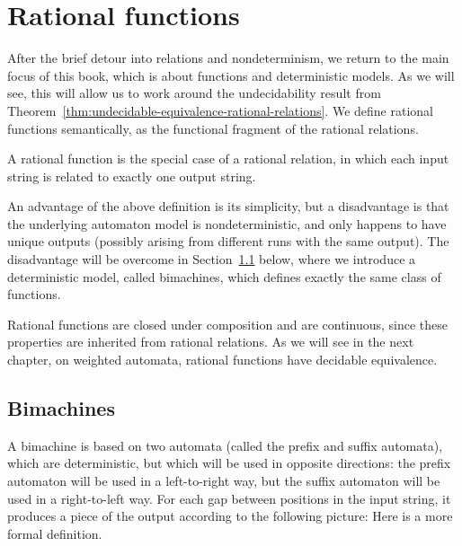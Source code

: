 \section{Rational functions}
\label{sec:rational-functions}

After the brief detour into relations and nondeterminism, we return to the main focus of this book, which is about  functions and deterministic models. As we will see, this will allow us to work around the undecidability result from Theorem~\ref{thm:undecidable-equivalence-rational-relations}. We define rational functions semantically, as the functional fragment of the rational relations. 

\begin{definition}
    \label{def:rational-function} A rational function is the special case of a rational relation, in which each input string is related to exactly one output string.
\end{definition}

An advantage of the above definition is its simplicity, but a disadvantage is that the underlying automaton model is nondeterministic, and only happens to have unique outputs (possibly arising from different runs with the same output). 
The disadvantage will be overcome in Section~\ref{sec:bimachines} below, where we introduce a deterministic model, called bimachines, which defines exactly the same class of functions.

Rational functions are closed under composition and are continuous, since these properties are inherited from rational relations. As we will see in the next chapter, on weighted automata, rational functions have decidable equivalence.

\subsection{Bimachines}
\label{sec:bimachines}

 A bimachine is based on two automata (called the prefix and suffix automata), which are deterministic, but which will be used in opposite directions: the prefix automaton will be used in a left-to-right way, but the suffix automaton will be used in a right-to-left way. For  each gap between positions in the input string, it produces a piece of the  output according to the following picture:
Here is a more formal definition.


